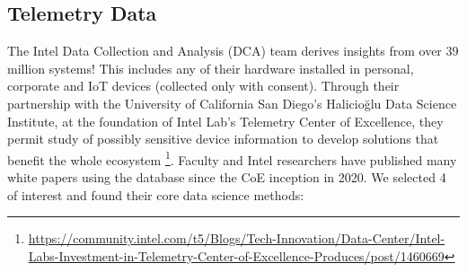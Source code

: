 \documentclass[12pt,letterpaper]{article}
\begin{document}
\subsection{Telemetry Data}

The Intel Data Collection and Analysis (DCA) team derives insights from over 39 million systems! This includes any of their hardware installed in personal, corporate and IoT devices (collected only with consent). Through their partnership with the University of California San Diego's Halicioğlu Data Science Institute, at the foundation of Intel Lab's Telemetry Center of Excellence, they permit study of possibly sensitive device information to develop solutions that benefit the whole ecosystem \footnote{\url{https://community.intel.com/t5/Blogs/Tech-Innovation/Data-Center/Intel-Labs-Investment-in-Telemetry-Center-of-Excellence-Produces/post/1460669}}. Faculty and Intel researchers have published many white papers using the database since the CoE inception in 2020. We selected 4 of interest and found their core data science methods:
\end{document}
